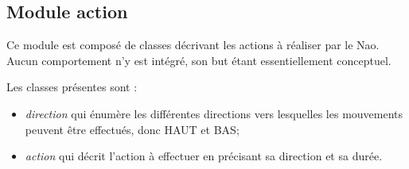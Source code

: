 \subsection{Module action}
\label{sub:Module action}
\par Ce module est composé de classes décrivant les actions à réaliser par le Nao. Aucun comportement n'y est intégré, son but étant essentiellement conceptuel.
\par Les classes présentes sont :
\begin{itemize}
\item \textit{direction} qui énumère les différentes directions vers lesquelles les mouvements peuvent être effectués, donc HAUT et BAS;
\item \textit{action} qui décrit l'action à effectuer en précisant sa direction et sa durée.
\end{itemize}